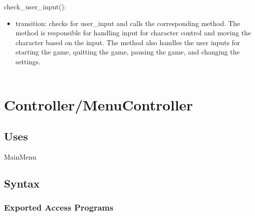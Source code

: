 \documentclass[12pt]{article}
\begin{document}
\noindent check\_user\_input():
\begin{itemize}
    \item transition: checks for user\_input and calls the corresponding method. The method is responsible for handling input for character control and moving the character based on the input. The method also handles the user inputs for starting the game, quitting the game, pausing the game, and changing the settings. \\\\
\end{itemize}

\newpage
\section*{Controller/MenuController}

\subsection* {Uses}

MainMenu

\subsection* {Syntax}

\subsubsection* {Exported Access Programs}
\end{document}

